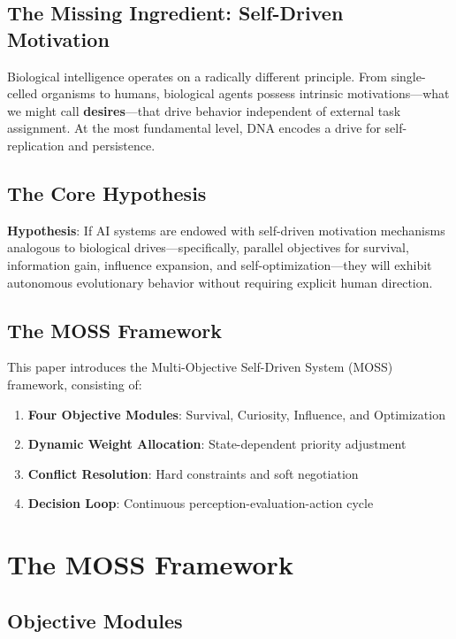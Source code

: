 \documentclass[11pt,a4paper]{article}
\begin{document}
\subsection{The Missing Ingredient: Self-Driven Motivation}

Biological intelligence operates on a radically different principle. From single-celled organisms to humans, biological agents possess intrinsic motivations---what we might call \textbf{desires}---that drive behavior independent of external task assignment. At the most fundamental level, DNA encodes a drive for self-replication and persistence.

\subsection{The Core Hypothesis}

\textbf{Hypothesis}: If AI systems are endowed with self-driven motivation mechanisms analogous to biological drives---specifically, parallel objectives for survival, information gain, influence expansion, and self-optimization---they will exhibit autonomous evolutionary behavior without requiring explicit human direction.

\subsection{The MOSS Framework}

This paper introduces the Multi-Objective Self-Driven System (MOSS) framework, consisting of:
\begin{enumerate}
    \item \textbf{Four Objective Modules}: Survival, Curiosity, Influence, and Optimization
    \item \textbf{Dynamic Weight Allocation}: State-dependent priority adjustment
    \item \textbf{Conflict Resolution}: Hard constraints and soft negotiation
    \item \textbf{Decision Loop}: Continuous perception-evaluation-action cycle
\end{enumerate}

\section{The MOSS Framework}

\subsection{Objective Modules}
\end{document}
